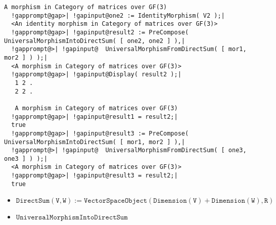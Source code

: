 \begin{computation}
\begin{Verbatim}[commandchars=!@|,fontsize=\small,frame=single,label=Example]
   A morphism in Category of matrices over GF(3)
  !gapprompt@gap>| !gapinput@one2 := IdentityMorphism( V2 );|
  <An identity morphism in Category of matrices over GF(3)>
  !gapprompt@gap>| !gapinput@result2 := PreCompose( UniversalMorphismIntoDirectSum( [ one2, one2 ] ),|
  !gapprompt@>| !gapinput@  UniversalMorphismFromDirectSum( [ mor1, mor2 ] ) );|
  <A morphism in Category of matrices over GF(3)>
  !gapprompt@gap>| !gapinput@Display( result2 );|
   1 2 .
   2 2 .
   
   A morphism in Category of matrices over GF(3)
  !gapprompt@gap>| !gapinput@result1 = result2;|
  true
  !gapprompt@gap>| !gapinput@result3 := PreCompose( UniversalMorphismIntoDirectSum( [ mor1, mor2 ] ),|
  !gapprompt@>| !gapinput@  UniversalMorphismFromDirectSum( [ one3, one3 ] ) );|
  <A morphism in Category of matrices over GF(3)>
  !gapprompt@gap>| !gapinput@result3 = result2;|
  true
\end{Verbatim}
\end{computation}

\begin{doctrine}

\begin{itemize}
\item $\mathtt{DirectSum (V, W) := VectorSpaceObject( Dimension( V ) + Dimension( W ), R )}$
\item $\mathtt{UniversalMorphismIntoDirectSum}$
\end{itemize}

\end{doctrine}

